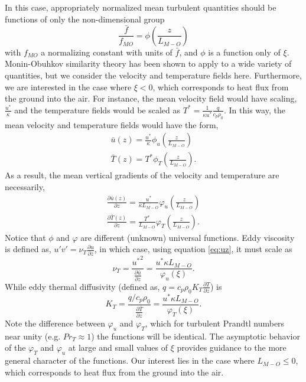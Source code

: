 In this case, appropriately normalized mean turbulent quantities should
be functions of only the non-dimensional group 
\begin{equation}
 \frac{\bar f}{f_{MO}} = \phi(\frac{z}{L_{M-O}})
\end{equation}
with $f_{MO}$ a normalizing constant with units of $\bar f$, and $\phi$
is a function only of $\xi$. Monin-Obuhkov similarity theory has been
shown to apply to a wide variety of
quantities\cite{wyngaard2010turbulence}, but we consider the velocity
and temperature fields here.  
Furthermore, we are interested in the case where
$\xi<0$, which corresponds to heat flux from the ground into the
air. For instance, the mean velocity field would have scaling,
$\frac{u^*}{\kappa}$ and the temperature fields would be scaled as $T^*
= \frac{1}{\kappa u^*} \frac{q}{c_p \rho_0}$. In this way, the mean
velocity and temperature fields would have the form,  
\begin{eqnarray}
\bar u(z) = \frac{u^*}{\kappa} \phi_u(\frac{z}{L_{M-O}}) \\
\bar T(z) = T^* \phi_T(\frac{z}{L_{M-O}}).
\end{eqnarray}
As a result, the mean vertical gradients of the velocity and temperature are
necessarily, 
\begin{eqnarray}
\frac{\partial \bar u(z)}{\partial z} = \frac{u^*}{\kappa L_{M-O}}
 \varphi_u(\frac{z}{L_{M-O}}) \label{eq:uz} \\ 
\frac{\partial \bar T(z)}{\partial z} = \frac{T^*}{L_{M-O}}
 \varphi_T(\frac{z}{L_{M-O}}) \label{eq:tz}.
\end{eqnarray}
Notice that $\phi$ and $\varphi$ are different (unknown) universal functions. Eddy
viscosity is defined as, $u'v' = \nu_T \frac{\partial
u}{\partial z}$\cite{durbin2001statistical}, in which case, using
equation \ref{eq:uz}, it must scale as
\begin{equation}
 \nu_T = \frac{{u^*}^2}{\frac{\partial \bar u}{\partial z}} = \frac{u^*
  \kappa L_{M-O}}{\varphi_u(\xi)}.
\end{equation}
While eddy thermal diffusivity (defined as, $q = c_p \rho_0 K_T
\frac{\partial T}{\partial z}$) is 
\begin{equation}
 K_T = \frac{q/c_p \rho_0}{\frac{\partial \bar T}{\partial z}} = \frac{u^*
  \kappa L_{M-O}}{\varphi_T(\xi)}.
\label{eqn:eddy_kt}
\end{equation}
Note the difference between $\varphi_u$ and
$\varphi_T$, which for turbulent Prandtl numbers near unity (e.g. $Pr_T
\approx 1$) the functions will be identical. The asymptotic behavior of
the $\varphi_T$ and $\varphi_u$ at large and small values of $\xi$
provides guidance to the more general character of the functions. 
Our interest lies in the case where $L_{M-O} \leq 0$, which corresponds
to heat flux from the ground into the air.  
%

